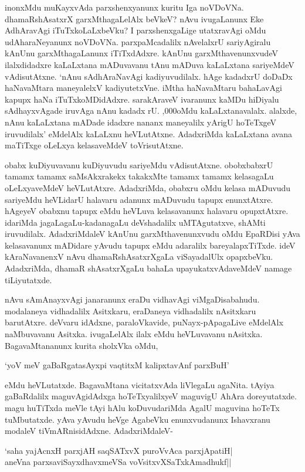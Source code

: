 inonxMdu muKayxvAda parxshenxyanunx kuritu Iga noVDoVNa. dhamaRshAsatxrX garxMthagaLelAlx beVkeV? nAvu ivugaLanunx Eke AdhAravAgi iTuTxkoLaLxbeVku? I parxshenxgaLige utatxravAgi oMdu udAharaNeyanunx noVDoVNa. parxpaMcadalilx nAvelalxrU sariyAgiralu kAnUnu garxMthagaLanunx iTiTxdAdxre. kAnUnu garxMthavenunxvudeV ilalxdidadxre kaLaLxtana mADuvavanu tAnu mADuva kaLaLxtana sariyeMdeV vAdisutAtxne. `nAnu sAdhAraNavAgi kadiyuvudilalx. hAge kadadxrU doDaDx haNavaMtara maneyalelxV kadiyutetxVne. iMtha haNavaMtaru bahaLavAgi kapupx haNa iTuTxkoMDidAdxre. sarakAraveV ivaranunx kaMDu hiDiyalu sAdhayxvAgade iruvAga nAnu kadadx rU. {,000}oMdu kaLaLxtanavalalx. alalxde, nAnu kaLaLxtana mADade idadxre nananx maneyalilx yArigU hoTeTxgeV iruvudilalx' eMdelAlx kaLaLxnu heVLutAtxne. AdadxriMda kaLaLxtana avana maTiTxge oLeLxya kelasaveMdeV toVrisutAtxne.

obabx kuDiyuvavanu kuDiyuvudu sariyeMdu vAdisutAtxne. obobxbabxrU tamamx tamamx saMsAkxrakekx takakxMte tamamx tamamx kelasagaLu oLeLxyaveMdeV heVLutAtxre. AdadxriMda, obabxru oMdu kelasa mADuvudu sariyeMdu heVLidarU halavaru adanunx mADuvudu tapupx enunxtAtxre. hAgeyeV obabxnu tapupx eMdu heVLuva kelasavanunx halavaru opupxtAtxre. idariMda jagaLagaLu-kadanagaLu deVshadalilx uMTAgutatxve, shAMti iruvudilalx. AdadxriMdaleV kAnUnu garxMthavenunxvudu oMdu EpaRDisi yAva kelasavanunx mADidare yAvudu tapupx eMdu adaralilx bareyalapxTiTxde. ideV kAraNavanenxV nAvu dhamaRshAsatxrXgaLa viSayadalUlx opapxbeVku. AdadxriMda, dhamaR shAsatxrXgaLu bahaLa upayukatxvAdaveMdeV namage tiLiyutatxde.

nAvu sAmAnayxvAgi janaranunx eraDu vidhavAgi viMgaDisabahudu. modalaneya vidhadalilx Asitxkaru, eraDaneya vidhadalilx nAsitxkaru barutAtxre. deVvaru idAdxne, paraloVkavide, puNayx-pApagaLive eMdelAlx naMbuvavanu Asitxka. ivugaLelAlx ilalx eMdu heVLuvavanu nAsitxka. BagavaMtananunx kurita sholxVka oMdu, 

\begin{shloka}
`yoV meV gaBaRgatasAyxpi vaqtitxM kalipxtavAnf parxBuH'
\end{shloka}

eMdu heVLutatxde. BagavaMtana vicitatxvAda liVlegaLu agaNita. tAyiya gaBaRdalilx maguvAgidAdxga hoTeTxyalilxyeV maguvigU AhAra doreyutatxde. magu huTiTxda meVle tAyi hAlu koDuvudariMda AgalU maguvina hoTeTx tuMbutatxde. yAva yAvudu heVge AgabeVku enunxvudanunx Ishavxranu modaleV tiVmARnisidAdxne. AdadxriMdaleV-

\begin{shloka}
`saha yajAcnxH parxjAH saqSATxvX puroVvAca parxjApatiH|\\
aneVna parxsaviSayxdhavxmeVSa voV\s sitxvXSaTxkAmadhukf||
\end{shloka}


